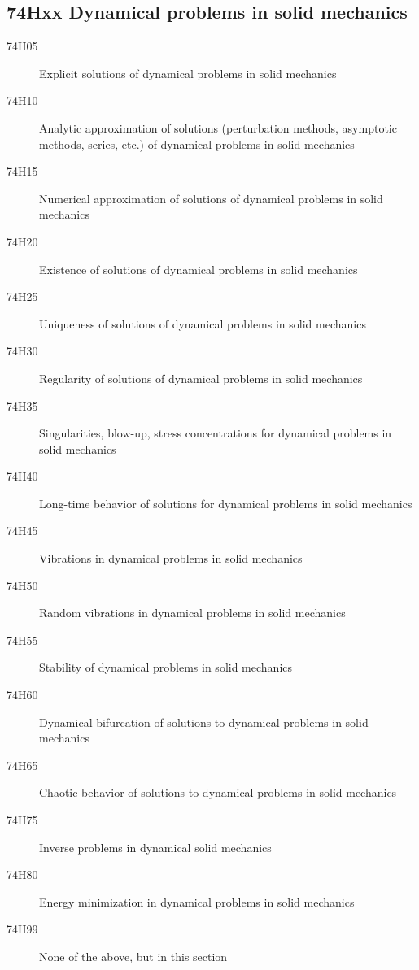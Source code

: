 \documentclass[letterpaper]{article}
\begin{document}
\subsection*{74Hxx  Dynamical problems in solid mechanics }\label{74Hxx}
\begin{description}  
\item [74H05]\label{74H05} Explicit solutions of dynamical problems in solid mechanics
\item [74H10]\label{74H10} Analytic approximation of solutions (perturbation methods, asymptotic methods, series, etc.) of dynamical problems in solid mechanics
\item [74H15]\label{74H15} Numerical approximation of solutions of dynamical problems in solid mechanics
\item [74H20]\label{74H20} Existence of solutions of dynamical problems in solid mechanics
\item [74H25]\label{74H25} Uniqueness of solutions of dynamical problems in solid mechanics
\item [74H30]\label{74H30} Regularity of solutions of dynamical problems in solid mechanics
\item [74H35]\label{74H35} Singularities, blow-up, stress concentrations for dynamical problems in solid mechanics
\item [74H40]\label{74H40} Long-time behavior of solutions for dynamical problems in solid mechanics
\item [74H45]\label{74H45} Vibrations in dynamical problems in solid mechanics
\item [74H50]\label{74H50} Random vibrations in dynamical problems in solid mechanics
\item [74H55]\label{74H55} Stability of dynamical problems in solid mechanics
\item [74H60]\label{74H60} Dynamical bifurcation of solutions to dynamical problems in solid mechanics
\item [74H65]\label{74H65} Chaotic behavior of solutions to dynamical problems in solid mechanics
\item [74H75]\label{74H75} Inverse problems in dynamical solid mechanics
\item [74H80]\label{74H80} Energy minimization in dynamical problems in solid mechanics
\item [74H99]\label{74H99} None of the above, but in this section
\end{description}
\end{document}

